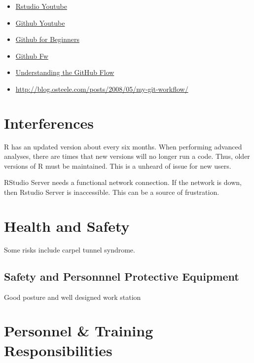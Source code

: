 \documentclass[12pt]{../SOP3_beta}
\begin{document}
\begin{itemize}
  \item \href{https://www.youtube.com/watch?v=uHYcDQDbMY8}{Rstudio Youtube}
  \item \href{https://www.youtube.com/watch?v=0fKg7e37bQE}{Github Youtube}
  \item \href{http://product.hubspot.com/blog/git-and-github-tutorial-for-beginners}{Github for Beginners}
  \item \href{http://scottchacon.com/2011/08/31/github-flow.html}{Github Fw}
  \item \href{https://guides.github.com/introduction/flow/}{Understanding the GitHub Flow}
  \item \href{http://blog.osteele.com/posts/2008/05/my-git-workflow/}{http://blog.osteele.com/posts/2008/05/my-git-workflow/}
  
\end{itemize}


\section{Interferences}

\NP R has an updated version about every six months. When performing advanced analyses, there are times that new versions will no longer run a code. Thus, older versions of R must be maintained. This is a unheard of issue for new users.

\NP RStudio Server needs a functional network connection. If the network is down, then Rstudio Server is inaccessible. This can be a source of frustration. 

\section{Health and Safety}

\NP Some risks include carpel tunnel syndrome. 


\subsection*{Safety and Personnnel Protective Equipment}

\NP Good posture and well designed work station

\section{Personnel \& Training Responsibilities}
\end{document}
